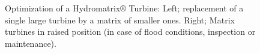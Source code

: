 \begin{figure}[h!]
\begin{minipage}[b]{0.5\linewidth}
 \centering
\end{minipage}
\begin{minipage}[b]{0.5\linewidth}
 \centering
\end{minipage}
\caption{Optimization of a Hydromatrix$\circledR$ Turbine: Left; replacement of a single large turbine by a matrix of smaller ones. Right; Matrix turbines in raised position (in case of flood conditions, inspection or maintenance).}
\label{Matrix_a}
\end{figure}

